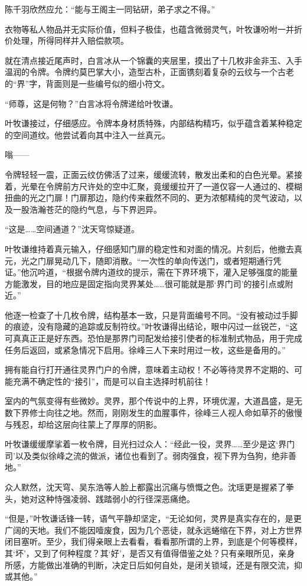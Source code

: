 陈千羽欣然应允：“能与王阁主一同钻研，弟子求之不得。”

衣物等私人物品并无实际价值，但料子极佳，也蕴含微弱灵气，叶牧谦吩咐一并折价处理，所得同样并入赔偿款项。

就在清点接近尾声时，白言冰从一个锦囊的夹层里，摸出了十几枚非金非玉、入手温润的令牌。令牌约莫巴掌大小，造型古朴，正面镌刻着复杂的云纹与一个古老的“界”字，背面则是一些编号似的细小符文。

“师尊，这是何物？”白言冰将令牌递给叶牧谦。

叶牧谦接过，仔细感应。令牌本身材质特殊，内部结构精巧，似乎蕴含着某种稳定的空间道纹。他尝试着向其中注入一丝真元。

嗡——

令牌轻轻一震，正面云纹仿佛活了过来，缓缓流转，散发出柔和的白色光晕。紧接着，光晕在令牌前方尺许处的空中汇聚，竟缓缓拉开了一道仅容一人通过的、模糊扭曲的光之门扉！门扉那边，隐约传来截然不同的、更为浓郁精纯的灵气波动，以及一股浩瀚苍茫的隐约气息，与下界迥异。

“这是……空间通道？”沈天穹惊疑道。

叶牧谦维持着真元输入，仔细感知门扉的稳定性和对面的情况。片刻后，他撤去真元，光之门扉晃动几下，随即消散。“一次性的单向传送门，或者短期通行凭证。”他沉吟道，“根据令牌内道纹的提示，需在下界环境下，灌入足够强度的能量方能激发，目的地应是固定指向灵界某处……很可能就是那‘界门司’的接引点或附近。”

他逐一检查了十几枚令牌，结构基本一致，只是背面编号不同。“没有被动过手脚的痕迹，没有隐藏的追踪或反制符纹。”叶牧谦得出结论，眼中闪过一丝锐芒，“这可真真正正是好东西。恐怕是那界门司配发给接引使者的标准制式物品，用于完成任务后返回，或紧急情况下启用。徐峰三人下来时用过一枚，这些是备用的。”

拥有能自行打开通往灵界门户的令牌，意味着主动权！不必等待灵界不定期的、可能充满不确定性的“接引”，而是可以自主选择时机前往！

室内的气氛变得有些微妙。灵界，那个传说中的上界，环境优渥，大道昌盛，是无数下界修士向往之地。然而，刚刚发生的血腥事件，徐峰三人视人命如草芥的傲慢与残忍，却给这层向往蒙上了厚厚的阴影。

叶牧谦缓缓摩挲着一枚令牌，目光扫过众人：“经此一役，灵界……至少是这‘界门司’以及类似徐峰之流的做派，诸位也看到了。弱肉强食，视下界为刍狗，绝非善地。”

众人默然，沈天穹、吴东浩等人脸上都露出沉痛与愤慨之色。沈瑶更是握紧了拳头，她对这种恃强凌弱、践踏弱小的行径深恶痛绝。

“但是，”叶牧谦话锋一转，语气平静却坚定，“无论如何，灵界是真实存在的，是更广阔的天地。我们不能因噎废食，因为几个恶徒，就永远蜷缩在下界，对上方世界闭目塞听。至少，我们得亲眼上去看看，看看那所谓的上界，到底是个何等模样，其‘坏’，又到了何种程度？其‘好’，是否又有值得借鉴之处？只有亲眼所见，亲身所感，方能做出准确的判断，决定日后如何自处，是闭关锁域，还是有限交流，抑或其他。”


